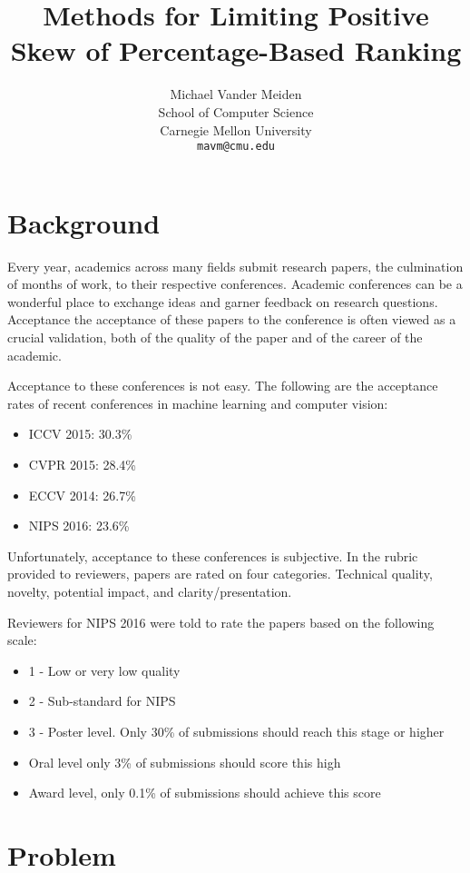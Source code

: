 \documentclass{article}
\title{Methods for Limiting Positive Skew of Percentage-Based Ranking}
\author{
  Michael Vander Meiden \\
  School of Computer Science\\
  Carnegie Mellon University\\
  \texttt{mavm@cmu.edu} \\
}
\begin{document}
\maketitle


\section{Background}
Every year, academics across many fields submit research papers, the culmination of months of work, to their respective conferences. Academic conferences can be a wonderful place to exchange ideas and garner feedback on research questions. Acceptance the acceptance of these papers to the conference is often viewed as a crucial validation, both of the quality of the paper and of the career of the academic.

Acceptance to these conferences is not easy. The following are the acceptance rates of recent conferences in machine learning and computer vision:

\begin{itemize}
\item ICCV 2015: 30.3\%
\item CVPR 2015: 28.4\%
\item ECCV 2014: 26.7\%
	\item NIPS 2016: 23.6\%
\end{itemize} 

Unfortunately, acceptance to these conferences is subjective. In the rubric provided to reviewers, papers are rated on four categories. Technical quality, novelty, potential impact, and clarity/presentation.

Reviewers for NIPS 2016 were told to rate the papers based on the following scale:
\begin{itemize}
\item 1 - Low or very low quality
\item 2 - Sub-standard for NIPS
\item 3 - Poster level. Only 30\% of submissions should reach this stage or higher
\item Oral level only 3\% of submissions should score this high
\item Award level, only 0.1\% of submissions should achieve this score
\end{itemize} 

\section{Problem}
\end{document}
